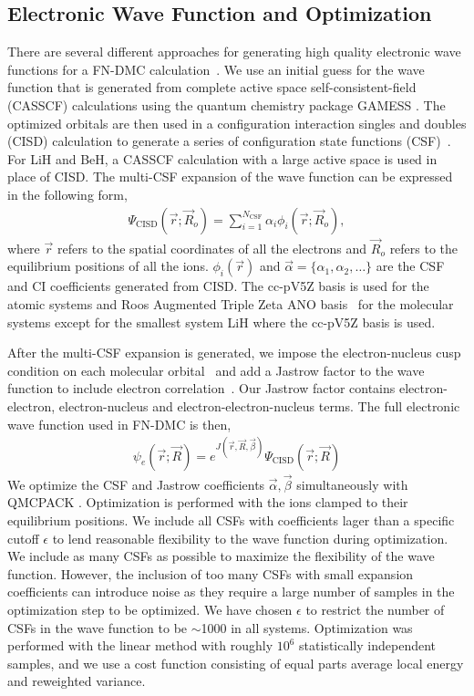 \documentclass[pra,superscriptaddress,groupedaddress,twocolumn]{revtex4}
\begin{document}
\subsection{Electronic Wave Function and Optimization}

There are several different approaches for generating high quality electronic wave functions for a FN-DMC calculation~\cite{Umrigar_Alleviation,Toulouse_Bench,Brown_Bench,Seth_Bench}. We use an initial guess for the wave function that is generated from complete active space self-consistent-field (CASSCF) \cite{Chaban_MCSCF,Szabo} calculations using the quantum chemistry package GAMESS \cite{GAMESS}. The optimized orbitals are then used in a configuration interaction singles and doubles (CISD) calculation to generate a series of configuration state functions (CSF)~\cite{Clark_Bench}. For LiH and BeH, a CASSCF calculation with a large active space is used in place of CISD. The multi-CSF expansion of the wave function can be expressed in the following form,
\begin{align}
\Psi_{\text{CISD}}(\vec{r};\vec{R}_o)=\sum\limits_{i=1}^{N_{\text{CSF}}}\alpha_i\phi_i(\vec{r};\vec{R}_o), \label{eq:psi_gms}
\end{align}
where $\vec{r}$ refers to the spatial coordinates of all the electrons and $\vec{R}_o$ refers to the equilibrium positions of all the ions. $\phi_i(\vec{r})$ and $\vec{\alpha}=\{\alpha_1,\alpha_2,\dots\}$ are the CSF and CI coefficients generated from CISD. The cc-pV5Z basis \cite{dunning} is used for the atomic systems and Roos Augmented Triple Zeta ANO basis~\cite{roos} for the molecular systems except for the smallest system LiH where the cc-pV5Z basis is used.

After the multi-CSF expansion is generated, we impose the electron-nucleus cusp condition on each molecular orbital~\cite{cusp} and add a Jastrow factor to the wave function to include electron correlation~\cite{Kato}. Our Jastrow factor contains electron-electron, electron-nucleus and electron-electron-nucleus terms. The full electronic wave function used in FN-DMC is then,
\begin{align}
\psi_e(\vec{r};\vec{R})=e^{J(\vec{r},\vec{R},\vec{\beta})}\Psi_{\text{CISD}}(\vec{r};\vec{R})\label{eq:psie}
\end{align}
We optimize the CSF and Jastrow coefficients $\vec{\alpha},\vec{\beta}$ simultaneously with QMCPACK \cite{QMCPACK}. Optimization is performed with the ions clamped to their equilibrium positions. We include all CSFs with coefficients lager than a specific cutoff $\epsilon$ to lend reasonable flexibility to the wave function during optimization. We include as many CSFs as possible to maximize the flexibility of the wave function. However, the inclusion of too many CSFs with small expansion coefficients can introduce noise as they require a large number of samples in the optimization step to be optimized. We have chosen $\epsilon$ to restrict the number of CSFs in the wave function to be $\sim$1000 in all systems. Optimization was performed with the linear method with roughly $10^6$ statistically independent samples, and we use a cost function consisting of equal parts average local energy and reweighted variance.
\end{document}
